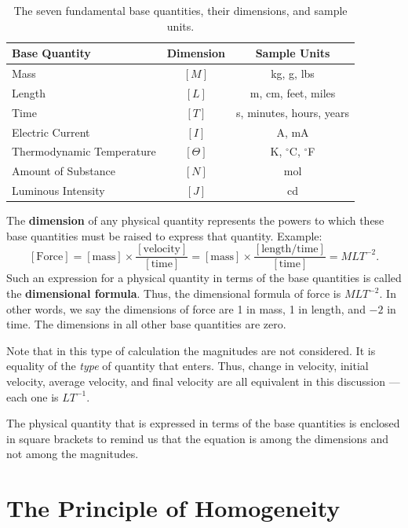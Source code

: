 \begin{table}[H]
  \centering
  \caption{The seven fundamental base quantities, their dimensions, and sample units.}
  \label{tab:base_quantities}
  \begin{tabular}{lcc}
    \toprule
    \textbf{Base Quantity} & \textbf{Dimension} & \textbf{Sample Units} \\
    \midrule
    Mass                          & $[M]$     & kg, g, lbs \\
    Length                        & $[L]$     & m, cm, feet, miles \\
    Time                          & $[T]$     & s, minutes, hours, years \\
    Electric Current              & $[I]$     & A, mA \\
    Thermodynamic Temperature     & $[\Theta]$& K, $^\circ$C, $^\circ$F \\
    Amount of Substance           & $[N]$     & mol \\
    Luminous Intensity            & $[J]$     & cd \\
    \bottomrule
  \end{tabular}
\end{table}

The \textbf{dimension} of any physical quantity represents the powers to which these base
quantities must be raised to express that quantity. Example:
\[
  [\text{Force}] = [\text{mass}]\times\frac{[\text{velocity}]}{[\text{time}]}
                 = [\text{mass}]\times\frac{[\text{length/time}]}{[\text{time}]}
                 = MLT^{-2}.
\]
Such an expression for a physical quantity in terms of the base quantities is called the
\textbf{dimensional formula}. Thus, the dimensional formula of force is $MLT^{-2}$. In other
words, we say the dimensions of force are 1 in mass, 1 in length, and $-2$ in time. The
dimensions in all other base quantities are zero.

Note that in this type of calculation the magnitudes are not considered. It is equality of the
\emph{type} of quantity that enters. Thus, change in velocity, initial velocity, average velocity,
and final velocity are all equivalent in this discussion --- each one is $LT^{-1}$.

The physical quantity that is expressed in terms of the base quantities is enclosed in square
brackets to remind us that the equation is among the dimensions and not among the magnitudes.


\section{The Principle of Homogeneity}

